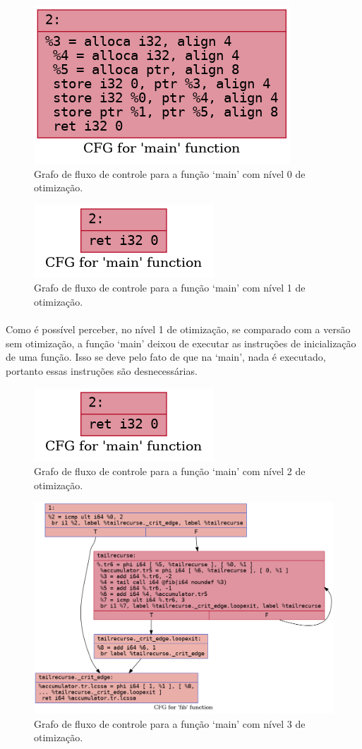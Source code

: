 \documentclass[12pt]{article}
\begin{document}
\begin{figure}
    \centering
    \includegraphics[width=0.5\linewidth]{private_.main_O0.png}
    \caption{Grafo de fluxo de controle para a função ‘main’ com nível 0 de otimização.}
\end{figure}

\begin{figure}
    \centering
    \includegraphics[width=0.5\linewidth]{private_.main_O1.png}
    \caption{Grafo de fluxo de controle para a função ‘main’ com nível 1 de otimização.}
\end{figure}

\paragraph{}Como é possível perceber, no nível 1 de otimização, se comparado com a versão sem otimização, a função ‘main’ deixou de executar as instruções de inicialização de uma função. Isso se deve pelo fato de que na ‘main’, nada é executado, portanto essas instruções são desnecessárias.

\begin{figure}
    \centering
    \includegraphics[width=0.5\linewidth]{private_.main_O2.png}
    \caption{Grafo de fluxo de controle para a função ‘main’ com nível 2 de otimização.}
\end{figure}

\begin{figure}
    \centering
    \includegraphics[width=0.5\linewidth]{fib2_.fib_O3.png}
    \caption{Grafo de fluxo de controle para a função ‘main’ com nível 3 de otimização.}
\end{figure}
\end{document}
